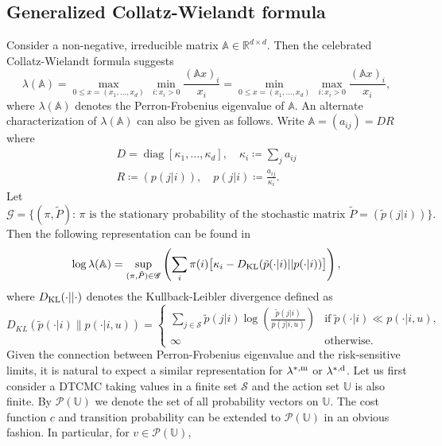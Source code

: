 \documentclass[notitlepage,11pt,reqno]{amsart}
\numberwithin{equation}{section}
\theoremstyle{plain}
\theoremstyle{definition}
\theoremstyle{remark}
\newcommand{\Act}{{\mathds{U}}}
\newcommand{\sG}{{\mathscr{G}}}     %
\newcommand{\Pm}{{\mathcal{P}}}     %
\newcommand{\cS}{{\mathcal{S}}}     %
\newcommand{\lamstrdm}{\lambda^{*,{\rm m}}}
\newcommand{\lamstrdf}{\lambda^{*,{\rm d}}}
\newcommand{\RR}{\mathds{R}} %
\DeclareMathOperator*{\diag}{diag}
\newcommand{\df}{\coloneqq}
\begin{document}
\subsection{Generalized Collatz-Wielandt formula}
Consider a non-negative, irreducible matrix $\mathbb{A}\in\RR^{d\times d}$. Then the celebrated Collatz-Wielandt \cite{MR8590,MR35265} formula suggests
\begin{equation}\label{E3.24}
\lambda(\mathbb{A})=\max_{0\leq x=(x_1, \ldots, x_d)}\, \min_{i: x_i>0}\frac{(\mathbb{A}x)_i}{x_i}=
\min_{0\leq x=(x_1, \ldots, x_d)}\, \max_{i: x_i>0}\frac{(\mathbb{A}x)_i}{x_i},
\end{equation}
where $\lambda(\mathbb{A})$ denotes the Perron-Frobenius eigenvalue of $\mathbb{A}$.  An alternate characterization of $\lambda(\mathbb{A})$
can also be given as follows. Write 
$\mathbb{A}=(a_{ij})=DR$ where 
\begin{equation*}
\begin{gathered}
D=\diag[\kappa_1, \ldots, \kappa_d],\quad \kappa_i\df\sum_{j} a_{ij}
\\
R\df(p(j|i)),\quad p(j|i)\df\frac{a_{ij}}{\kappa_i}.
\end{gathered}
\end{equation*}
Let 
$$\sG=\{(\pi, \tilde{P}):\, \text{$\pi$ is the stationary
probability of the stochastic matrix $\tilde{P}=(\tilde{p}(j|i))$}\}.$$
Then the following representation can be found in \cite{MR2571413}
\begin{equation}\label{E-KL}
\log\lambda(\mathbb{A})
=\sup_{(\pi, \tilde{P})\in\sG} \left(\sum_{i} \pi(i)\bigl[\kappa_i-
D_{\rm KL}(\tilde{p}(\cdot|i)||p(\cdot|i))\bigr]\right),
\end{equation}
where $D_{\rm KL}(\cdot||\cdot)$ denotes the Kullback-Leibler divergence defined as
$$
D_{KL}(\tilde{p}(\cdot|i)\|p(\cdot|i,u))=
\begin{cases}
\sum_{j\in\cS}\tilde{p}(j|i)\log\left(\frac{\tilde{p}(j|i)}{p(j|i,u)}\right) & \text{if}
\; \tilde{p}(\cdot|i)\ll p(\cdot|i,u),
\\
\infty & \text{otherwise}.
\end{cases}
$$
 Given the connection between Perron-Frobenius eigenvalue and the 
risk-sensitive limits, it is natural to expect a similar representation for $\lamstrdm$ or $\lamstrdf$. Let us first consider a DTCMC taking values in a
finite set $\cS$ and the action set $\Act$ is also finite. By
$\Pm(\Act)$ we denote the set of all probability vectors on $\Act$.
The cost function $c$ and transition probability can be extended to
$\Pm(\Act)$ in an obvious fashion. In particular, for $v\in \Pm(\Act)$,
\end{document}
